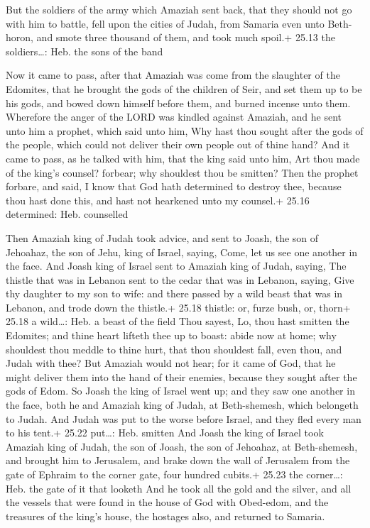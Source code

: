  But the soldiers of the army which Amaziah sent back,
that they should not go with him to battle, fell upon the cities of
Judah, from Samaria even unto Beth-horon, and smote three thousand of
them, and took much spoil.+ 25.13 the soldiers\ldots: Heb. the sons of
the band

 Now it came to pass, after that Amaziah was come from
the slaughter of the Edomites, that he brought the gods of the children
of Seir, and set them up to be his gods, and bowed down himself before
them, and burned incense unto them.  Wherefore the anger of
the LORD was kindled against Amaziah, and he sent unto him a prophet,
which said unto him, Why hast thou sought after the gods of the people,
which could not deliver their own people out of thine hand?
 And it came to pass, as he talked with him, that the king
said unto him, Art thou made of the king's counsel? forbear; why
shouldest thou be smitten? Then the prophet forbare, and said, I know
that God hath determined to destroy thee, because thou hast done this,
and hast not hearkened unto my counsel.+ 25.16 determined: Heb.
counselled

 Then Amaziah king of Judah took advice, and sent to
Joash, the son of Jehoahaz, the son of Jehu, king of Israel, saying,
Come, let us see one another in the face.  And Joash king
of Israel sent to Amaziah king of Judah, saying, The thistle that was in
Lebanon sent to the cedar that was in Lebanon, saying, Give thy daughter
to my son to wife: and there passed by a wild beast that was in Lebanon,
and trode down the thistle.+ 25.18 thistle: or, furze bush, or, thorn+
25.18 a wild\ldots: Heb. a beast of the field  Thou sayest,
Lo, thou hast smitten the Edomites; and thine heart lifteth thee up to
boast: abide now at home; why shouldest thou meddle to thine hurt, that
thou shouldest fall, even thou, and Judah with thee?  But
Amaziah would not hear; for it came of God, that he might deliver them
into the hand of their enemies, because they sought after the gods of
Edom.  So Joash the king of Israel went up; and they saw
one another in the face, both he and Amaziah king of Judah, at
Beth-shemesh, which belongeth to Judah.  And Judah was put
to the worse before Israel, and they fled every man to his tent.+ 25.22
put\ldots: Heb. smitten  And Joash the king of Israel took
Amaziah king of Judah, the son of Joash, the son of Jehoahaz, at
Beth-shemesh, and brought him to Jerusalem, and brake down the wall of
Jerusalem from the gate of Ephraim to the corner gate, four hundred
cubits.+ 25.23 the corner\ldots: Heb. the gate of it that looketh
 And he took all the gold and the silver, and all the
vessels that were found in the house of God with Obed-edom, and the
treasures of the king's house, the hostages also, and returned to
Samaria.

